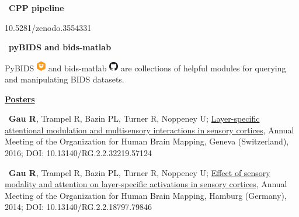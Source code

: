 \documentclass[a4paper,12pt,oneside]{letter}
\begin{document}
{    \textbullet~\textbf{CPP pipeline}
    
    10.5281/zenodo.3554331
    
    
    \textbullet~\textbf{pyBIDS and bids-matlab}
    
    PyBIDS \href{https://doi.org/10.5281/zenodo.2537312}{\includegraphics[width=0.4cm]{materials_small_color.png}} and bids-matlab \href{https://github.com/bids-standard/bids-matlab}{{\includegraphics[width=0.4cm]{github.png}}} are collections of helpful modules for querying and manipulating BIDS datasets.
 

\begin{center}
 \href{https://osf.io/xgdh7/}{\large\textbf{Posters}}
\end{center}

\textbullet~\textbf{Gau R}, Trampel R, Bazin PL, Turner R, Noppeney U; \href{http://www.researchgate.net/profile/Remi_Gau/publication/312040907_Layer-specific_attentional_modulation_and_multisensory_interactions_in_sensory_cortices/links/586bec8108ae8fce4919e07e.pdf?origin=publication_detail&ev=pub_int_prw_xdl&msrp=ebfE-ttTbrYfVzAofje5aX7FDjiW85HC3yqk8seJjhsOoLqmeRviQBtfDuXmv_czDArKxDp2vM32swxlbQzyvbVTbKL6xRpsEZ-BeqgslOo.KWD8vv500DrprbLnXSrDxinWDQrliScdbic1rjyyqLUG12KOwbjri9jbFDwSYWMkGLoSocKyAei7eQLoDCU9Dw.4eQVGmpcVG-AAQDI4KiYt-xA9SDkF_u7xvWOznoi52trnfagq5aJVIAgpfhgitdzt3LYuUPdJ8gE6jmG5I94Nw}{Layer-specific attentional modulation and multisensory interactions in sensory cortices}, Annual Meeting of the Organization for Human Brain Mapping, Geneva (Switzerland), 2016; DOI: 10.13140/RG.2.2.32219.57124

\textbullet~\textbf{Gau R}, Trampel R, Bazin PL, Turner R, Noppeney U; \href{http://www.researchgate.net/profile/Remi_Gau/publication/312040995_Effect_of_sensory_modality_and_attention_on_layer-specific_activations_in_sensory_cortices/links/586bef4108ae329d621216ff.pdf?origin=publication_detail&ev=pub_int_prw_xdl&msrp=rWGQkC7vAu_P6H2YxCI3M31egmAPzpbXdoRN1OdTlFE2ytvRyytc2DItV2mPnvlGPXAOT-Q0hOx0cWKEfhvF_ZK7oOzQtXTOX1cxj1f7wdc.EjFU3lhxIUR_qptyNrCYqZDXVg6nG7zWe8VL0WxLSdSMUGnjz_v4L5Yov-RWctdEwDPFRXLasy1FBdCk7Dlydw.IANTdlTw5MPB88HQJNdTi7lFv6Sygddbknct3mMTSsgH20heYrYcKnbsQLxtcsNd-HHWZUEIEP4-7bkQLNDUhQ}{Effect of sensory modality and attention on layer-specific activations in sensory cortices}, Annual Meeting of the Organization for Human Brain Mapping, Hamburg (Germany), 2014; DOI: 10.13140/RG.2.2.18797.79846

}
\end{document}
